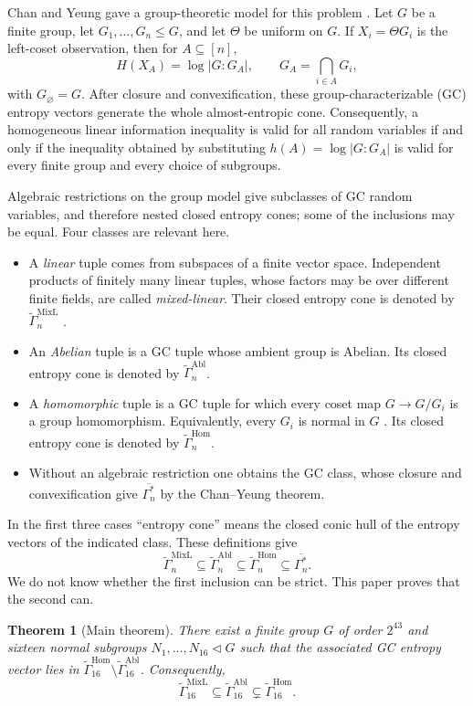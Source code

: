 \documentclass[journal]{IEEEtran}
\newtheorem{theorem}{Theorem}
\newcommand{\AEnt}[1][n]{\overline{\Gamma^*_{#1}}}
\newcommand{\MixL}{\widetilde\Gamma^{\mathrm{MixL}}}
\newcommand{\Abl}{\widetilde\Gamma^{\mathrm{Abl}}}
\newcommand{\Hom}{\widetilde\Gamma^{\mathrm{Hom}}}
\begin{document}
Chan and Yeung gave a group-theoretic model for this problem
\cite{ChanYeung2002}.  Let $G$ be a finite group, let
$G_1,\ldots,G_n\le G$, and let $\Theta$ be uniform on $G$.  If $X_i=\Theta G_i$ is the
left-coset observation, then for $A\subseteq[n]$,
\begin{equation}\label{eq:gc-entropy-intro}
  H(X_A)=\log |G:G_A|,
  \qquad
  G_A=\bigcap_{i\in A}G_i,
\end{equation}
with $G_\varnothing=G$.  After closure and convexification, these
group-characterizable (GC) entropy vectors generate the whole almost-entropic
cone.  Consequently, a homogeneous linear information inequality is valid for
all random variables if and only if the inequality obtained by substituting
$h(A)=\log|G:G_A|$ is valid for every finite group and every choice of
subgroups.

Algebraic restrictions on the group model give subclasses of GC random
variables, and therefore nested closed entropy cones; some of the inclusions
may be equal.  Four classes are relevant here.
\begin{itemize}
\item A \emph{linear} tuple comes from subspaces of a finite vector space.
Independent products of finitely many linear tuples, whose factors may be over
different finite fields, are called \emph{mixed-linear}.  Their closed entropy
cone is denoted by $\MixL_n$ \cite{JafariKhazaei2021}.
\item An \emph{Abelian} tuple is a GC tuple whose ambient group is Abelian.  Its
closed entropy cone is denoted by $\Abl_n$.
\item A \emph{homomorphic} tuple is a GC tuple for which every coset map
$G\to G/G_i$ is a group homomorphism.  Equivalently, every $G_i$ is normal in
$G$ \cite{KaboliKhazaeiParviz2021}.  Its closed entropy cone is denoted by
$\Hom_n$.
\item Without an algebraic restriction one obtains the GC class, whose closure
and convexification give $\AEnt$ by the Chan--Yeung theorem.
\end{itemize}
In the first three cases ``entropy cone'' means the closed conic hull of the
entropy vectors of the indicated class.  These definitions give
\begin{equation}\label{eq:hierarchy-intro}
  \MixL_n\subseteq\Abl_n\subseteq\Hom_n\subseteq\AEnt.
\end{equation}
We do not know whether the first inclusion can be strict.  This paper proves
that the second can.

\begin{theorem}[Main theorem]\label{thm:main}
There exist a finite group $G$ of order $2^{43}$ and sixteen normal subgroups
$N_1,\ldots,N_{16}\triangleleft G$ such that the associated GC entropy vector
lies in $\Hom_{16}\setminus\Abl_{16}$.  Consequently,
\[
  \MixL_{16}\subseteq\Abl_{16}\subsetneq\Hom_{16}.
\]
\end{theorem}
\end{document}
